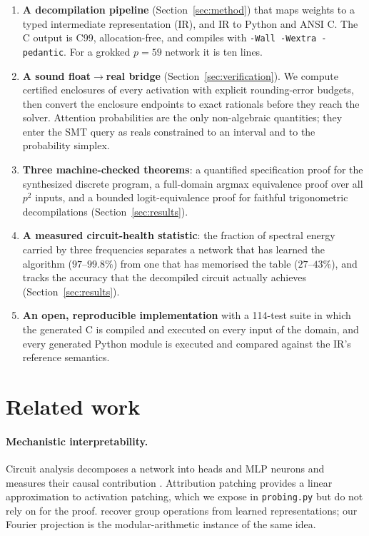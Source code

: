 \documentclass[11pt]{article}
\newcommand{\code}[1]{\texttt{#1}}
\begin{document}
\begin{enumerate}[leftmargin=1.4em,itemsep=2pt]
  \item \textbf{A decompilation pipeline} (Section~\ref{sec:method}) that maps
        weights to a typed intermediate representation (IR), and IR to Python and
        ANSI C. The C output is C99, allocation-free, and compiles with
        \code{-Wall -Wextra -pedantic}. For a grokked $p=59$ network it is ten
        lines.
  \item \textbf{A sound float$\to$real bridge} (Section~\ref{sec:verification}).
        We compute certified enclosures of every activation with explicit
        rounding-error budgets, then convert the enclosure endpoints to exact
        rationals before they reach the solver. Attention probabilities are the
        only non-algebraic quantities; they enter the SMT query as reals
        constrained to an interval and to the probability simplex.
  \item \textbf{Three machine-checked theorems}: a quantified specification
        proof for the synthesized discrete program, a full-domain argmax
        equivalence proof over all $p^2$ inputs, and a bounded logit-equivalence
        proof for faithful trigonometric decompilations
        (Section~\ref{sec:results}).
  \item \textbf{A measured circuit-health statistic}: the fraction of spectral
        energy carried by three frequencies separates a network that has learned
        the algorithm ($97$--$99.8\%$) from one that has memorised the table
        ($27$--$43\%$), and tracks the accuracy that the decompiled circuit
        actually achieves (Section~\ref{sec:results}).
  \item \textbf{An open, reproducible implementation} with a 114-test suite in
        which the generated C is compiled and executed on every input of the
        domain, and every generated Python module is executed and compared
        against the IR's reference semantics.
\end{enumerate}

\section{Related work}
\label{sec:related}

\paragraph{Mechanistic interpretability.}
Circuit analysis decomposes a network into heads and MLP neurons and measures
their causal contribution \citep{elhage2021framework,nanda2023grokking,
olsson2022incontext,wang2022interpretability}. Attribution patching
\citep{kramar2024atp} provides a linear approximation to activation patching,
which we expose in \code{probing.py} but do not rely on for the proof.
\citet{chughtai2023group} recover group operations from learned representations;
our Fourier projection is the modular-arithmetic instance of the same idea.
\end{document}
